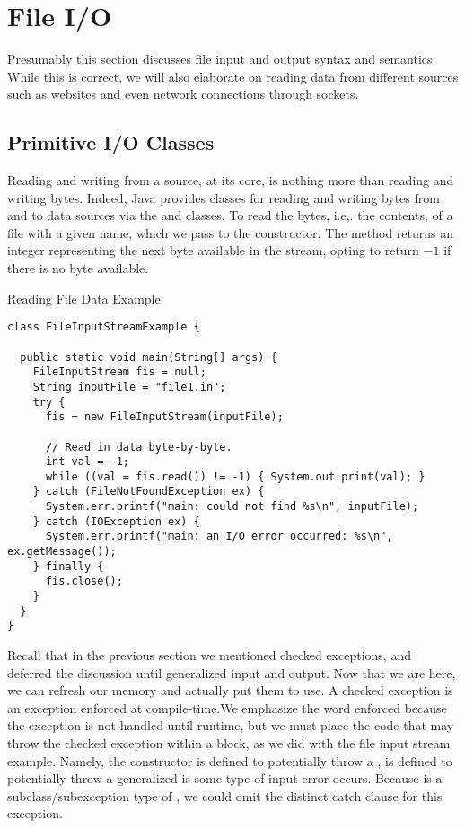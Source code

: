 \section{File I/O}

Presumably this section discusses file input and output syntax and semantics. While this is correct, we will also elaborate on reading data from different sources such as websites and even network connections through sockets. 

\subsection*{Primitive I/O Classes}

Reading and writing from a source, at its core, is nothing more than reading and writing bytes. Indeed, Java provides classes for reading and writing bytes from and to data sources via the  and  classes. To read the bytes, i.e,. the contents, of a file with a given name, which we pass to the  constructor. The  method returns an integer representing the next byte available in the stream, opting to return $-1$ if there is no byte available. 


\begin{cl}{Reading File Data Example}
\begin{lstlisting}[language=MyJava]
class FileInputStreamExample {

  public static void main(String[] args) {
    FileInputStream fis = null;
    String inputFile = "file1.in";
    try {
      fis = new FileInputStream(inputFile);
      
      // Read in data byte-by-byte.
      int val = -1;
      while ((val = fis.read()) != -1) { System.out.print(val); }
    } catch (FileNotFoundException ex) {
      System.err.printf("main: could not find %s\n", inputFile);
    } catch (IOException ex) {
      System.err.printf("main: an I/O error occurred: %s\n", ex.getMessage());
    } finally {
      fis.close();
    } 
  } 
}
\end{lstlisting}
\end{cl}

Recall that in the previous section we mentioned checked exceptions, and deferred the discussion until generalized input and output. Now that we are here, we can refresh our memory and actually put them to use. A checked exception is an exception enforced at compile-time.We emphasize the word enforced because the exception is not handled until runtime, but we must place the code that may throw the checked exception within a  block, as we did with the file input stream example. Namely, the  constructor is defined to potentially throw a ,  is defined to potentially throw a generalized  is some type of input error occurs. Because  is a subclass/subexception type of , we could omit the distinct catch clause for this exception. 

